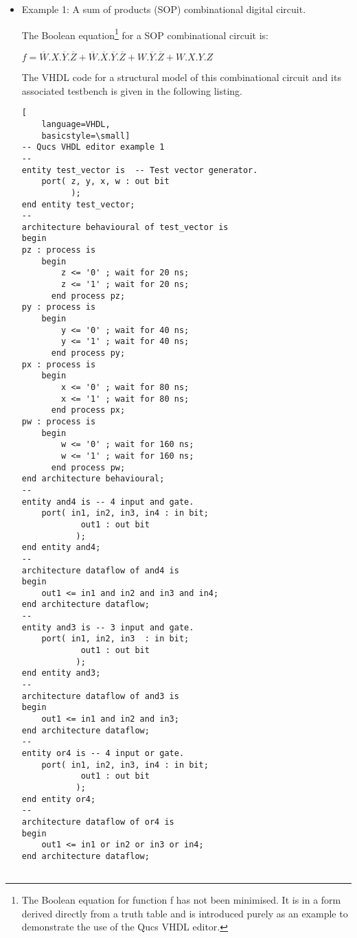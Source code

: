 \begin{itemize}
\item Example 1: A sum of products (SOP) combinational digital circuit.

The Boolean equation\footnote{The Boolean equation for function f has
not been minimised.  It is in a form derived directly from a truth
table and is introduced purely as an example to demonstrate the use of
the Qucs VHDL editor.} for a SOP combinational circuit is:
\begin{center}
\begin{large}$f=\overline{W}.X.\overline{Y}.\overline{Z}+\overline{W}.\overline{X}.\overline{Y}.\overline{Z}+W.\overline{Y}.\overline{Z}+W.X.Y.Z$\end{large}
\end{center}

The VHDL code for a structural model of this combinational circuit and
its associated testbench is given in the following listing.

\begin{lstlisting}[
    language=VHDL,
    basicstyle=\small]
-- Qucs VHDL editor example 1
--
entity test_vector is  -- Test vector generator.
	port( z, y, x, w : out bit
	      );
end entity test_vector;
--
architecture behavioural of test_vector is
begin 
pz : process is
	begin 
		z <= '0' ; wait for 20 ns;
		z <= '1' ; wait for 20 ns;
      end process pz;
py : process is
	begin 
		y <= '0' ; wait for 40 ns;
		y <= '1' ; wait for 40 ns;
      end process py;
px : process is
	begin 
		x <= '0' ; wait for 80 ns;
		x <= '1' ; wait for 80 ns;
      end process px;
pw : process is
	begin 
		w <= '0' ; wait for 160 ns;
		w <= '1' ; wait for 160 ns;
      end process pw;
end architecture behavioural;
--
entity and4 is -- 4 input and gate.
	port( in1, in2, in3, in4 : in bit;
	        out1 : out bit
	       );
end entity and4;
--
architecture dataflow of and4 is
begin 
	out1 <= in1 and in2 and in3 and in4;
end architecture dataflow;
--
entity and3 is -- 3 input and gate.
	port( in1, in2, in3  : in bit;
	        out1 : out bit
	       );
end entity and3;
--
architecture dataflow of and3 is
begin 
	out1 <= in1 and in2 and in3;
end architecture dataflow;
--
entity or4 is -- 4 input or gate.
	port( in1, in2, in3, in4 : in bit;
	        out1 : out bit
	       );
end entity or4;
--
architecture dataflow of or4 is
begin 
	out1 <= in1 or in2 or in3 or in4;
end architecture dataflow;


\end{lstlisting}
\end{itemize}
